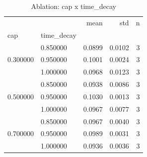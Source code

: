 \begin{table}[h]
\centering
\begin{tabular}{llrrr}
\toprule
 &  & mean & std & n \\
cap & time_decay &  &  &  \\
\midrule
\multirow[t]{3}{*}{0.300000} & 0.850000 & 0.0899 & 0.0102 & 3 \\
 & 0.950000 & 0.1001 & 0.0024 & 3 \\
 & 1.000000 & 0.0968 & 0.0123 & 3 \\
\cline{1-5}
\multirow[t]{3}{*}{0.500000} & 0.850000 & 0.0938 & 0.0086 & 3 \\
 & 0.950000 & 0.1030 & 0.0013 & 3 \\
 & 1.000000 & 0.0967 & 0.0077 & 3 \\
\cline{1-5}
\multirow[t]{3}{*}{0.700000} & 0.850000 & 0.0967 & 0.0040 & 3 \\
 & 0.950000 & 0.0989 & 0.0031 & 3 \\
 & 1.000000 & 0.0936 & 0.0036 & 3 \\
\cline{1-5}
\bottomrule
\end{tabular}
\caption{Ablation: cap x time_decay}
\label{tab:ablation}
\end{table}
